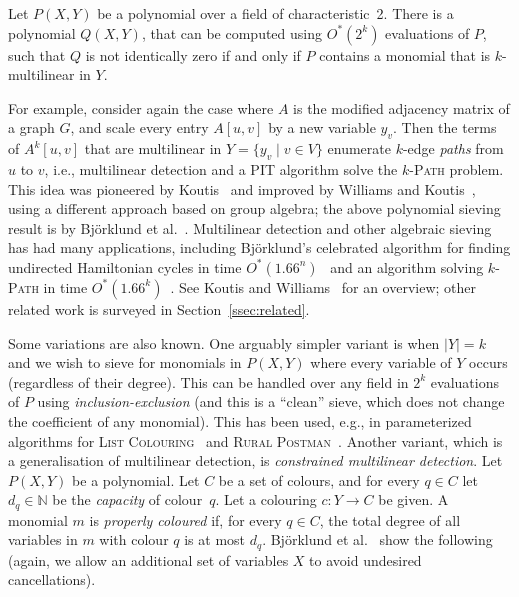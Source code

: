 \documentclass{theoretics}
\newcommand{\N}{\ensuremath{\mathbb N}\xspace}
\begin{document}
\begin{lemma} \label{lemma:multlinear}
  Let $P(X,Y)$ be a polynomial 
  over a field of characteristic~2. There is a polynomial $Q(X,Y)$,
  that can be computed using $O^*(2^k)$ evaluations of $P$, such that $Q$
  is not identically zero if and only if $P$ contains a monomial that
  is $k$-multilinear in $Y$.
\end{lemma}

For example, consider again the case where $A$ is the modified
adjacency matrix of a graph $G$, and scale every entry $A[u,v]$ by
a new variable $y_v$. Then the terms of $A^k[u,v]$ that are
multilinear in $Y=\{y_v \mid v \in V\}$ enumerate $k$-edge
\emph{paths} from $u$ to $v$, i.e., multilinear detection and a PIT
algorithm solve the \textsc{$k$-Path} problem.
This idea was pioneered by Koutis~\cite{Koutis08ICALP} and
improved by Williams and Koutis~\cite{KoutisW09limits,Williams09IPL},
using a different approach based on group algebra; the above
polynomial sieving result is by Björklund et al.~\cite{Bjorklund14detsum,BjorklundHKK17narrow}.
Multilinear detection and other algebraic sieving has had many applications, including Bj\"orklund's
celebrated algorithm for finding undirected Hamiltonian cycles in time
$O^*(1.66^n)$~\cite{Bjorklund14detsum} and an algorithm solving
\textsc{$k$-Path} in time $O^*(1.66^k)$~\cite{BjorklundHKK17narrow}.
See Koutis and Williams~\cite{KoutisW16CACM} for an overview; other
related work is surveyed in Section~\ref{ssec:related}.

Some variations are also known. One arguably simpler variant 
is when $|Y|=k$ and we wish to sieve for monomials in $P(X,Y)$ where
every variable of $Y$ occurs (regardless of their degree).
This can be handled over any field in $2^k$ evaluations of $P$
using \emph{inclusion-exclusion} (and this is a ``clean'' sieve, which
does not change the coefficient of any monomial).
This has been used, e.g., in parameterized algorithms for
\textsc{List Colouring}~\cite{GutinMOW21listcol} and 
\textsc{Rural Postman}~\cite{GutinWY17rpostman}.
Another variant, which is a generalisation of multilinear detection, 
is \emph{constrained multilinear detection}.
Let $P(X,Y)$ be a polynomial. Let $C$ be a set of colours, and for
every $q \in C$ let $d_q \in \N$ be the \emph{capacity} of colour~$q$.
Let a colouring $c \colon Y \to C$ be given.
A monomial $m$ is \emph{properly coloured} if, for every $q \in C$,
the total degree of all variables in $m$ with colour $q$ is at most $d_q$. 
Bj\"orklund et al.~\cite{BjorklundKK16} show the following (again, we
allow an additional set of variables $X$ to avoid undesired
cancellations).
\end{document}
